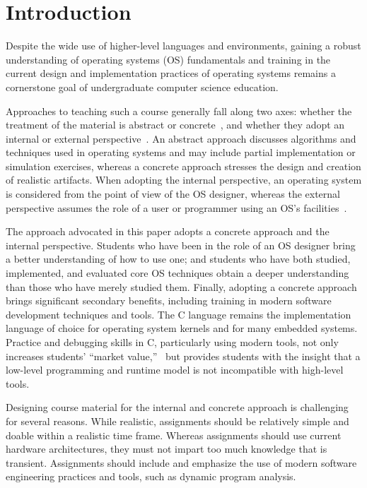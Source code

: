 \section{Introduction}
\label{sec:intro}

Despite the wide use of higher-level languages and environments, gaining a robust
understanding of operating systems (OS) fundamentals and training in the current design and
implementation practices of operating systems remains a cornerstone goal of 
undergraduate computer science education.

Approaches to teaching such a course generally fall along two axes: 
whether the treatment of the material is abstract or 
concrete~\cite{Hovemeyer2004Running}, and whether they adopt an
internal or external perspective~\cite{Deitel2003Operating}.
An abstract approach discusses algorithms and techniques used in operating 
systems and may include partial implementation or simulation exercises,
whereas a concrete approach stresses the design and creation of 
realistic artifacts.
When adopting the internal perspective, an operating system is considered
from the point of view of the OS designer, whereas the external perspective 
assumes the role of a user or programmer using an OS's 
facilities~\cite{Bryant2002Computer}.

The approach advocated in this paper adopts a concrete approach and the internal
perspective.  Students who have been in the role of an
OS designer bring a better understanding of how to use one; and students
who have both studied, implemented, and evaluated core OS techniques obtain 
a deeper understanding than those who have merely studied them.
Finally, adopting a concrete approach brings significant secondary
benefits, including training in modern software development techniques
and tools.  The C language remains the implementation language of choice
for operating system kernels and for many embedded systems.
Practice and debugging skills in C, particularly using modern tools,
not only increases students' ``market value,''~\cite{1292450} but provides students with
the insight that a low-level programming and runtime model is not incompatible
with high-level tools.

Designing course material for the internal and concrete 
approach is challenging for several reasons.  While realistic, 
assignments should be relatively simple and doable within a realistic time frame.  
Whereas assignments should use current hardware architectures, 
they must not impart too much knowledge that is transient.
Assignments should include and emphasize the use of modern software 
engineering practices and tools, such as dynamic program analysis.


